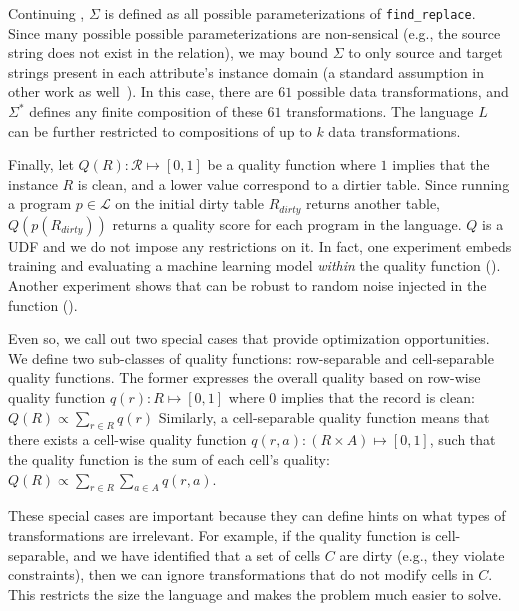 \begin{example}\label{ex2}
  Continuing , $\Sigma$ is defined as all possible parameterizations of \texttt{find\_replace}.  Since many possible possible parameterizations are non-sensical (e.g., the source string does not exist in the relation), we may bound $\Sigma$ to only source and target strings present in each attribute's instance domain (a standard assumption in other work as well~\cite{DBLP:series/synthesis/2012Fan}).  In this case, there are $61$ possible data transformations, and $\Sigma^*$ defines any finite composition of these $61$ transformations.  The language $L$ can be further restricted to compositions of up to $k$ data transformations.  
\end{example}

Finally, let $Q(R): \mathcal{R} \mapsto [0,1]$ be a quality function where $1$ implies that the instance $R$ is clean, and a lower value correspond to a dirtier table.
Since running a program $p\in\mathcal{L}$ on the initial dirty table $R_{dirty}$ returns another table, $Q(p(R_{dirty}))$ returns a quality score for each program in the language.  
$Q$ is a UDF and we do not impose any restrictions on it. In fact, one experiment embeds training and evaluating a machine learning model {\it within} the quality function ().  Another experiment shows that \sys can be robust to random noise injected in the function ().   

Even so, we call out two special cases that provide optimization opportunities. 
We define two sub-classes of quality functions: row-separable and cell-separable quality functions.
The former expresses the overall quality based on row-wise quality function $q(r): R \mapsto [0,1]$ where $0$ implies that the record is clean:
$Q(R) \propto \sum\nolimits_{r \in R} q(r)$
Similarly, a cell-separable quality function means that there exists a cell-wise quality function $q(r, a): (R\times A) \mapsto [0,1]$, such that the quality function is the sum of each cell's quality: 
$Q(R) \propto \sum\nolimits_{r \in R} \sum_{a \in A} q(r,a)$.

These special cases are important because they can define hints on what types of transformations are irrelevant.
For example, if the quality function is cell-separable, and we have identified that a set of cells $C$ are dirty (e.g., they violate constraints), then we can ignore transformations that do not modify cells in $C$.  This restricts the size the language and makes the problem much easier to solve.


